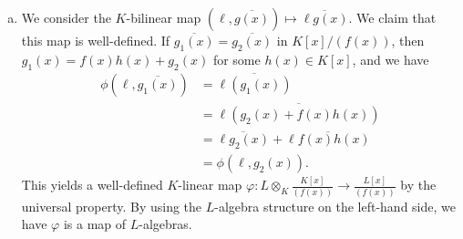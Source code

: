 \documentclass[10pt]{mypackage}
\begin{document}
\begin{solution}\hfill
  \begin{enumerate}[(a)]
    \item We consider the $K$-bilinear map $\left( \ell, \overline{g(x)} \right) \mapsto \overline{\ell g(x)}$. We claim that this map is well-defined. If $ \overline{g_1(x)} = \overline{g_2(x)} $ in $K[x]/\left( f(x) \right)$, then $g_1(x) = f(x)h(x) + g_2(x)$ for some $h(x)\in K[x]$, and we have
      \begin{align*}
        \phi\left( \ell, \overline{g_1(x)} \right) &= \overline{\ell\left( g_1(x) \right)}\\
                                               &= \overline{\ell\left( g_2(x) + f(x)h(x)\right)}\\
                                               &= \overline{\ell g_2(x)} + \overline{\ell f(x)h(x)}\\
                                               &= \phi\left( \ell,g_2(x) \right).
      \end{align*}
      This yields a well-defined $K$-linear map $\varphi\colon L\otimes_{K} \frac{K[x]}{\left( f(x) \right)}\rightarrow \frac{L[x]}{\left( f(x) \right)}$ by the universal property. By using the $L$-algebra structure on the left-hand side, we have $\varphi$ is a map of $L$-algebras.


\end{enumerate}
\end{solution}
\end{document}
